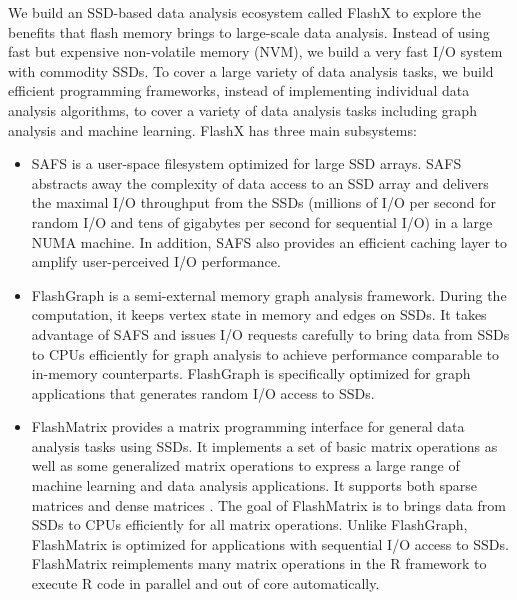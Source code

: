 We build an SSD-based data analysis ecosystem called FlashX to explore
the benefits that flash memory brings to large-scale data analysis. Instead
of using fast but expensive non-volatile memory (NVM), we build a very fast
I/O system with commodity SSDs. To cover a large variety of data analysis tasks,
we build efficient programming frameworks, instead of implementing individual
data analysis algorithms, to cover a variety of data analysis tasks including
graph analysis and machine learning. FlashX has three main subsystems:
\begin{itemize}
	\item SAFS \cite{safs} is a user-space filesystem optimized for large SSD
		arrays. SAFS abstracts away the complexity of data access to an SSD array
		and delivers the maximal I/O throughput from the SSDs (millions of I/O
		per second for random I/O and tens of gigabytes per second for sequential
		I/O) in a large NUMA
		machine. In addition, SAFS also provides an efficient caching layer
		\cite{hotstorage12} to amplify user-perceived I/O performance.
	\item FlashGraph \cite{flashgraph} is a semi-external memory graph analysis
		framework. During the computation, it keeps vertex state in memory and
		edges on SSDs. It takes advantage of SAFS and issues I/O requests
		carefully to bring data from SSDs to CPUs efficiently for graph analysis
		to achieve performance comparable to in-memory counterparts. FlashGraph
		is specifically optimized for graph applications that generates random
		I/O access to SSDs.
	\item FlashMatrix provides a matrix programming interface for general data
		analysis tasks using SSDs. It implements a set of basic matrix operations
		as well as some generalized matrix operations to express a large range
		of machine learning and data analysis applications. It supports
		both sparse matrices \cite{SEM_SpMM} and dense matrices \cite{flashmatrix}.
		The goal of FlashMatrix is to brings data from SSDs to CPUs efficiently for
		all matrix operations. Unlike
		FlashGraph, FlashMatrix is optimized for applications with sequential
		I/O access to SSDs. FlashMatrix reimplements many matrix operations
		in the R framework to execute R code in parallel and out of core
		automatically.
\end{itemize}

